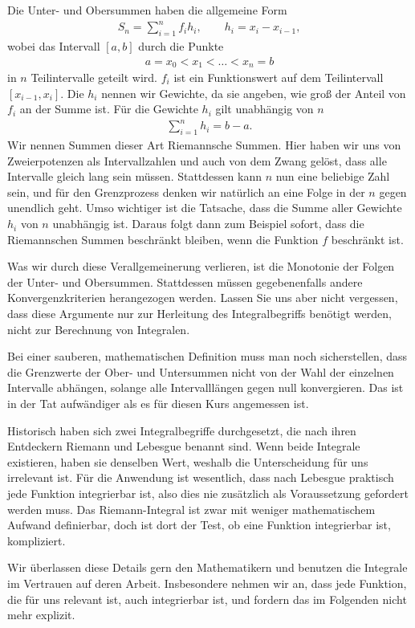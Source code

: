 \begin{Vertiefung}
    Die Unter- und Obersummen haben die allgemeine Form
    \begin{gather*}
        S_n = \sum_{i=1}^n f_i h_i,\qquad h_i = x_i-x_{i-1},
    \end{gather*}
    wobei das Intervall $[a,b]$ durch die Punkte
    \begin{gather*}
        a = x_0 < x_1 < \dots < x_n = b
    \end{gather*}
    in $n$ Teilintervalle geteilt wird. $f_i$ ist ein Funktionswert auf dem Teilintervall $[x_{i-1},x_i]$.
    Die $h_i$ nennen wir Gewichte, da sie angeben, wie groß der Anteil von $f_i$ an der Summe ist. Für die Gewichte $h_i$ gilt unabhängig von $n$ 
    \begin{gather*}
        \sum_{i=1}^n h_i = b-a.
    \end{gather*}
Wir nennen Summen dieser Art Riemannsche Summen.    
Hier haben wir uns von Zweierpotenzen als Intervallzahlen und auch von dem Zwang gelöst, dass alle Intervalle gleich lang sein müssen. Stattdessen kann $n$ nun eine beliebige Zahl sein, und für den Grenzprozess denken wir natürlich an eine Folge in der $n$ gegen unendlich geht.
Umso wichtiger ist die Tatsache, dass die Summe aller Gewichte $h_i$ von $n$ unabhängig ist. Daraus folgt dann zum Beispiel sofort, dass die Riemannschen Summen beschränkt bleiben, wenn die Funktion $f$ beschränkt ist.

Was wir durch diese Verallgemeinerung verlieren, ist die Monotonie der Folgen der Unter- und Obersummen. Stattdessen müssen gegebenenfalls andere Konvergenzkriterien herangezogen werden. Lassen Sie uns aber nicht vergessen, dass diese Argumente nur zur Herleitung des Integralbegriffs benötigt werden, nicht zur Berechnung von Integralen.

Bei einer sauberen, mathematischen Definition muss man noch sicherstellen, dass die Grenzwerte der Ober- und Untersummen nicht von der Wahl der einzelnen Intervalle abhängen, solange alle Intervalllängen gegen null konvergieren. Das ist in der Tat aufwändiger als es für diesen Kurs angemessen ist.

Historisch haben sich zwei Integralbegriffe durchgesetzt, die nach ihren Entdeckern Riemann und Lebesgue benannt sind. Wenn beide Integrale existieren, haben sie denselben Wert, weshalb die Unterscheidung für uns irrelevant ist.
Für die Anwendung ist wesentlich, dass nach Lebesgue praktisch jede Funktion integrierbar ist, also dies nie zusätzlich als Voraussetzung gefordert werden muss. Das Riemann-Integral ist zwar mit weniger mathematischem Aufwand definierbar, doch ist dort der Test, ob eine Funktion integrierbar ist, kompliziert.

Wir überlassen diese Details gern den Mathematikern und benutzen die Integrale im Vertrauen auf deren Arbeit. Insbesondere nehmen wir an, dass jede Funktion, die für uns relevant ist, auch integrierbar ist, und fordern das im Folgenden nicht mehr explizit.
\end{Vertiefung}

